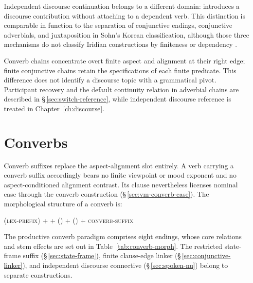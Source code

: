 Independent discourse continuation belongs to a different domain: 
introduces a discourse contribution without attaching to a dependent verb.
This distinction is comparable in function to the separation of conjunctive
endings, conjunctive adverbials, and juxtaposition in Sohn's Korean
classification, although those three mechanisms do not classify Iridian
constructions by finiteness or dependency \cite[291--292]{sohn2009}.

Converb chains concentrate overt finite aspect and alignment at their right
edge; finite conjunctive chains retain the specifications of each finite
predicate. This difference does not identify a discourse topic with a
grammatical pivot. Participant recovery and the default continuity relation in
adverbial chains are described in §\,\ref{sec:switch-reference}, while
independent discourse reference is treated in Chapter~\ref{ch:discourse}.

\section{Converbs}\label{sec:converb-morphology}


Converb suffixes replace the aspect-alignment slot entirely. A verb carrying a
converb suffix accordingly bears no finite viewpoint or mood exponent and
no aspect-conditioned alignment contrast. Its clause nevertheless licenses
nominal case through the converb construction (§\,\ref{sec:vm-converb-case}). The
morphological structure of a converb is:

\medskip
\begin{center}
(\textsc{lex-prefix}) + \Stem{} + (\Appl{}) + (\Caus{}) + \textsc{converb-suffix}
\end{center}
\medskip

The productive converb paradigm comprises eight endings, whose core relations
and stem effects are set out in Table~\ref{tab:converb-morph}. The restricted
state-frame suffix  (§\,\ref{sec:state-frame}), finite clause-edge
linker  (§\,\ref{sec:conjunctive-linker}), and independent discourse connective
 (§\,\ref{sec:spoken-nu}) belong to separate constructions.

